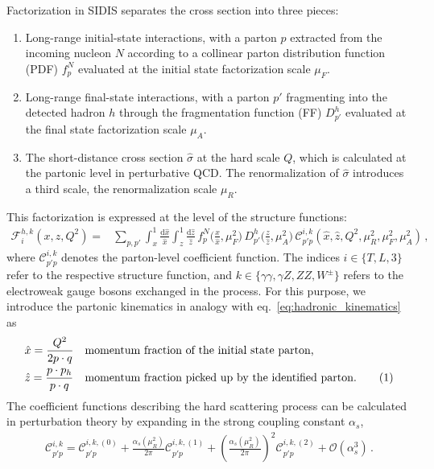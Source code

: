 \documentclass[11pt,a4paper]{article}
\newcommand{\Fcal}{\mathcal{F}}
\newcommand{\Ccal}{\mathcal{C}}
\newcommand{\dd}{\mathrm{d}}
\newcommand{\xh}{\hat{x}}
\newcommand{\zh}{\hat{z}}
\newcommand\numberthis{\addtocounter{equation}{1}\tag{\theequation}}
\begin{document}
Factorization in SIDIS separates the cross section into three pieces:
\begin{enumerate}[label=(\roman*)]
\item Long-range initial-state interactions, with a parton $p$ extracted from the incoming nucleon $N$ according to a collinear parton distribution function (PDF) $f_p^N$ evaluated at the initial state factorization scale $\mu_F$.
\item Long-range final-state interactions, with a parton $p'$ fragmenting into the detected hadron $h$ through the fragmentation function (FF) $D_{p'}^h$ evaluated at the final state factorization scale $\mu_A$.
\item The short-distance cross section $\hat{\sigma}$ at the hard scale $Q$, which is calculated at the partonic level in perturbative QCD. The renormalization of $\hat{\sigma}$ introduces a third scale, the renormalization scale $\mu_R$.
\end{enumerate}
This factorization is expressed at the level of the structure functions:
\begin{align}\label{eq:Fcal_Gcal}
\Fcal_i^{h,k}(x,z,Q^2) =& \sum_{p,p'}\int_x^1 \frac{\dd \xh}{\xh} \int_z^1 \frac{\dd \zh}{\zh} \, f_p^N\bigg(\frac{x}{\xh},\mu_F^2\bigg)\, D^h_{p'}\bigg(\frac{z}{\zh},\mu_A^2\bigg) \, \Ccal^{i,k}_{p'p}(\xh,\zh,Q^2,\mu_R^2,\mu_F^2,\mu_A^2) \, ,
\end{align}
where $\Ccal^{i,k}_{p'p}$ denotes the parton-level coefficient function.
The indices $i\in\{T,L,3\}$ refer to the respective structure function, and $k\in\{\gamma \gamma, \gamma Z, ZZ, W^\pm \}$ refers to the electroweak gauge bosons exchanged in the process.
For this purpose, we introduce the partonic kinematics in analogy with eq.~\eqref{eq:hadronic_kinematics} as
\begin{align*}
&\xh=\frac{Q^2}{2p\cdot q} &&\text{momentum fraction of the initial state parton,}  \\
&\zh=\frac{p\cdot p_h}{p\cdot q}  &&\text{momentum fraction
picked up by the identified parton.} \numberthis
\label{eq:partonic_kinematics}
\end{align*}
The coefficient functions describing the hard scattering process can be calculated in perturbation theory by expanding in the strong coupling constant $\alpha_s$,
\begin{align}
\Ccal^{i,k}_{p'p}=\Ccal^{i,k, (0)}_{p'p}+\frac{\alpha_s(\mu_R^2)}{2\pi} \Ccal^{i,k, (1)}_{p'p}+\left(\frac{\alpha_s(\mu_R^2)}{2\pi}\right)^2 \Ccal^{i,k, (2)}_{p'p} +\mathcal{O}(\alpha_s^3)\,  .
\end{align}
\end{document}
